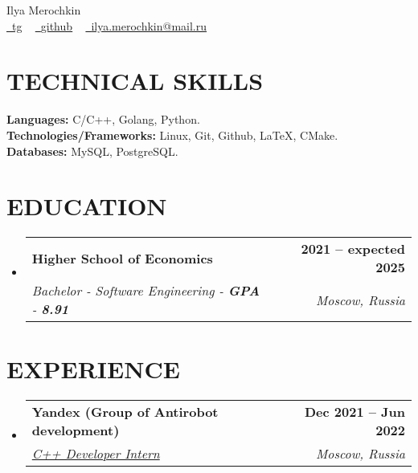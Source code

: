 \documentclass[letterpaper,11pt]{article}
\makeatletter
\newcommand{\resumeSubheading}[4]{
  \vspace{-2pt}\item
    \begin{tabular*}{1.0\textwidth}[t]{l@{\extracolsep{\fill}}r}
      \textbf{\large#1} & \textbf{\small #2} \\
      \textit{\large#3} & \textit{\small #4} \\
      
    \end{tabular*}\vspace{-7pt}
}
\newcommand{\resumeSubHeadingListStart}{\begin{itemize}[leftmargin=0.0in, label={}]}
\newcommand{\resumeSubHeadingListEnd}{\end{itemize}}
\makeatother
\begin{document}


\begin{center}
    {\Huge  Ilya Merochkin} \\ \vspace{10pt}
    \href{https://t.me/ilya_totl}{\raisebox{-0.2\height}\faTelegram\ \underline{tg}} ~
    \href{https://github.com/ilyatotl}{\raisebox{-0.2\height}\faGithub\ \underline{github}} ~
    \href{mailto:fodor.osetrov@gmail.com}{\raisebox{-0.2\height}\faEnvelope\  \underline{ilya.merochkin@mail.ru}} ~ 
    \vspace{-8pt}
\end{center}

\section{TECHNICAL SKILLS}
 \begin{itemize}[leftmargin=0.15in, label={}]
    \small{\item{
     \textbf{\normalsize{Languages:}}{ \normalsize{C/C++, Golang, Python.}} \\
     \textbf{\normalsize{Technologies/Frameworks:}}{\normalsize{ Linux, Git, Github, LaTeX, CMake.}} \\
     \textbf{\normalsize{Databases:}}{\normalsize{ MySQL, PostgreSQL.}} \\
    }}
 \end{itemize}
 \vspace{-15pt}

\section{EDUCATION}
  \resumeSubHeadingListStart
    \resumeSubheading
      {Higher School of Economics}{2021 -- expected 2025}
      {Bachelor - Software Engineering - \textbf{GPA} - \textbf{8.91}}{Moscow, Russia}
  \resumeSubHeadingListEnd


\section{EXPERIENCE}
  \resumeSubHeadingListStart

    \resumeSubheading
      {Yandex (Group of Antirobot development) }{Dec 2021 -- Jun 2022} 
      {\underline{C++ Developer Intern}}{Moscow, Russia}
  \resumeSubHeadingListEnd
\vspace{-12pt}
\end{document}
